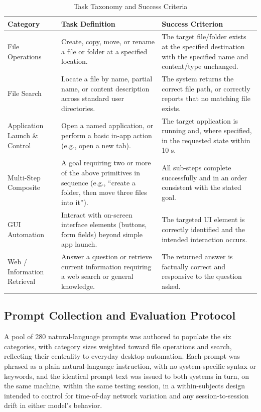 \documentclass[conference]{IEEEtran}
\begin{document}
\begin{table}[htbp]
\caption{Task Taxonomy and Success Criteria}
\label{tab:taxonomy}
\centering
\begin{tabular}{p{2.6cm}p{6.5cm}p{7.5cm}}
\toprule
\textbf{Category} & \textbf{Task Definition} & \textbf{Success Criterion} \\
\midrule
File Operations & Create, copy, move, or rename a file or folder at a specified location. & The target file/folder exists at the specified destination with the specified name and content/type unchanged. \\
File Search & Locate a file by name, partial name, or content description across standard user directories. & The system returns the correct file path, or correctly reports that no matching file exists. \\
Application Launch \& Control & Open a named application, or perform a basic in-app action (e.g., open a new tab). & The target application is running and, where specified, in the requested state within 10 s. \\
Multi-Step Composite & A goal requiring two or more of the above primitives in sequence (e.g., ``create a folder, then move three files into it''). & All sub-steps complete successfully and in an order consistent with the stated goal. \\
GUI Automation & Interact with on-screen interface elements (buttons, form fields) beyond simple app launch. & The targeted UI element is correctly identified and the intended interaction occurs. \\
Web / Information Retrieval & Answer a question or retrieve current information requiring a web search or general knowledge. & The returned answer is factually correct and responsive to the question asked. \\
\bottomrule
\end{tabular}
\end{table}

\subsection{Prompt Collection and Evaluation Protocol}

A pool of 280 natural-language prompts was authored to populate the six categories, with category sizes weighted toward file operations and search, reflecting their centrality to everyday desktop automation. Each prompt was phrased as a plain natural-language instruction, with no system-specific syntax or keywords, and the identical prompt text was issued to both systems in turn, on the same machine, within the same testing session, in a within-subjects design intended to control for time-of-day network variation and any session-to-session drift in either model's behavior.
\end{document}
